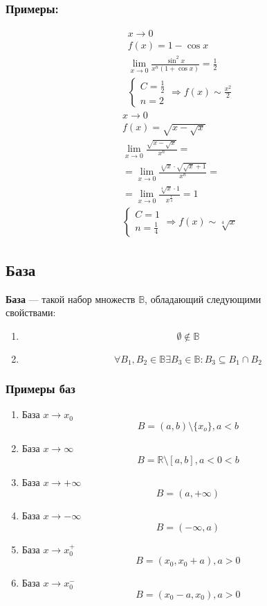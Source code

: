 \documentclass{article}
\begin{document}
\subsubsection*{Примеры:}

\begin{gather*}
	x \to 0 \\
	f(x) = 1 - \cos x \\
	\lim_{x \to 0} \frac{\sin^2 x}{x^n(1 + \cos x)} = \frac{1}{2} \\
	\begin{cases}
		C = \frac{1}{2} \\
		n = 2
	\end{cases}
	\Rightarrow f(x) \sim \frac{x^2}{2}
\end{gather*}
\begin{gather*}
	x \to 0 \\
	f(x) = \sqrt{x - \sqrt{x}} \\
	\lim_{x \to 0} \frac{\sqrt{x - \sqrt{x}}}{x^n} = \\
	= \lim_{x \to 0} \frac{\sqrt[4]{x} \cdot \sqrt{\sqrt{x} + 1}}{x^n} = \\
	= \lim_{x \to 0} \frac{\sqrt[4]{x} \cdot 1}{x^{\frac{1}{4}}} = 1 \\
	\begin{cases}
		C = 1 \\
		n = \frac{1}{4}
	\end{cases}
	\Rightarrow f(x) \sim \sqrt[4]{x}
\end{gather*}

\subsection{База}

\textbf{База} --- такой набор множеств $\mathbb{B}$, обладающий следующими \\
свойствами:

\begin{enumerate}
	\item \[ \emptyset \not \in \mathbb{B} \]
	\item \[ \forall B_1, B_2 \in \mathbb{B} \exists B_3 \in \mathbb{B} : B_3 \subseteq B_1 \cap B_2 \]
\end{enumerate}

\subsubsection{Примеры баз}

\begin{enumerate}
	\item База $x \to x_0$
	\[ B = (a, b) \setminus \{ x_o \}, a < b \]
	\item База $x \to \infty$
	\[ B = \mathbb{R} \setminus [a, b], a < 0 < b \]
	\item База $x \to +\infty$
	\[ B = (a, +\infty) \]
	\item База $x \to -\infty$
	\[ B = (-\infty, a) \]
	\item База $x \to x_0^{+}$
	\[ B = (x_0, x_0 + a), a > 0 \]
	\item База $x \to x_0^{-}$
	\[ B = (x_0 - a, x_0), a > 0 \]
\end{enumerate}
\end{document}
